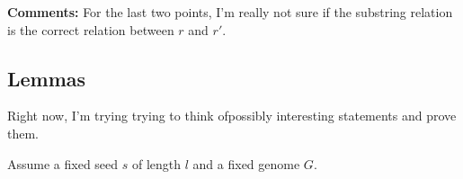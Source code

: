 \documentclass{article}
\begin{document}
{\bf Comments:} For the last two points, I'm really not sure if the
substring relation is the correct relation between $r$ and $r'$.


\subsection{Lemmas}

Right now, I'm trying trying to think ofpossibly interesting
statements and prove them.

Assume a fixed seed $s$ of length $l$ and a fixed genome $G$.
\end{document}
